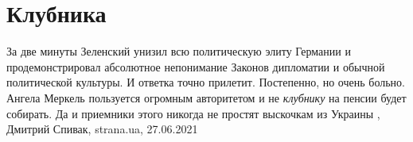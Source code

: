 
 
 
 
 
\chapter{Клубника}
\label{sec:slova.klubnika}

За две минуты Зеленский унизил всю политическую элиту Германии и
продемонстрировал абсолютное непонимание Законов дипломатии и обычной
политической культуры.  И ответка точно прилетит. Постепенно, но очень больно.
Ангела Меркель пользуется огромным авторитетом и не \emph{клубнику} на пенсии
будет собирать.  Да и приемники этого никогда не простят выскочкам из Украины
, 
Дмитрий Спивак, strana.ua, 27.06.2021
